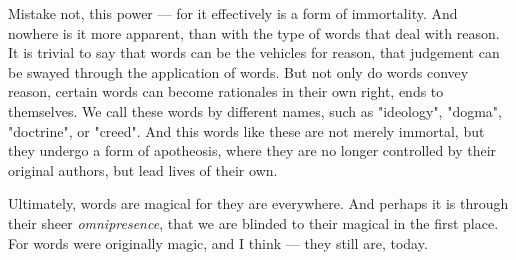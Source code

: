 Mistake not, this power --- for it effectively is a form of immortality. And nowhere is it more apparent, than with the type of words that deal with reason. It is trivial to say that words can be the vehicles for reason, that judgement can be swayed through the application of words. But not only do words convey reason, certain words can become rationales in their own right, ends to themselves. We call these words by different names, such as "ideology", "dogma", "doctrine", or "creed". And this words like these are not merely immortal, but they undergo a form of apotheosis, where they are no longer controlled by their original authors, but lead lives of their own.

Ultimately, words are magical for they are everywhere. And perhaps it is through their sheer \emph{omnipresence}, that we are blinded to their magical in the first place. For words were originally magic, and I think --- they still are, today.
